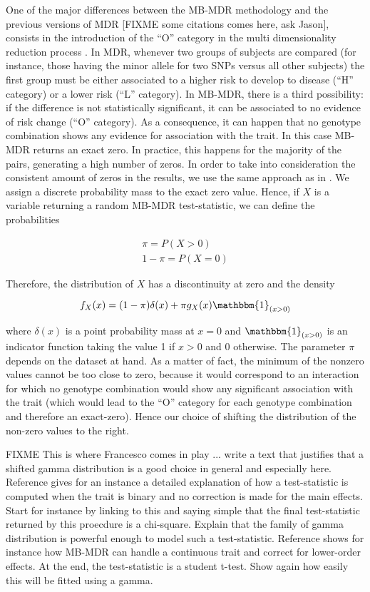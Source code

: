 \documentclass{bmcart}
\begin{document}
One of the major differences between the MB-MDR methodology and the previous versions of MDR [FIXME some citations comes here, ask Jason], consists in the introduction of the ``O'' category in the multi dimensionality reduction process \cite{Calle2008,Cattaert2011}. In MDR, whenever two groups of subjects are compared (for instance, those having the minor allele for two SNPs versus all other subjects) the first group must be either associated to a higher risk to develop to disease (``H'' category) or a lower risk (``L'' category). In MB-MDR, there is a third possibility: if the difference is not statistically significant, it can be associated to no evidence of risk change (``O'' category). As a consequence, it can happen that no genotype combination shows any evidence for association with the trait. In this case MB-MDR returns an exact zero. In practice, this happens for the majority of the pairs, generating a high number of zeros. In order to take into consideration the consistent amount of zeros in the results, we use the same approach as in \cite{Hautsch2013}. We assign a discrete probability mass to the exact zero value. Hence, if $X$ is a variable returning a random MB-MDR test-statistic, we can define the probabilities 

\begin{eqnarray*}
\pi = P(X > 0) \\
1-\pi = P(X = 0) 
\end{eqnarray*}

Therefore, the distribution of $X$ has a discontinuity at zero and the density 

\begin{equation}
f_X(x) = (1-\pi) \delta(x) + \pi g_X(x) \mathbbm{1}_{(x>0)}
\end{equation}


where $\delta(x)$ is a point probability mass at $x=0$ and $\mathbbm{1}_{(x>0)}$ is an indicator function taking the value 1 if $x>0$ and 0 otherwise. 
The parameter $\pi$ depends on the dataset at hand. As a matter of fact, the minimum of the nonzero values cannot be too close to zero, because it would correspond to an interaction for which no genotype combination would show any significant association with the trait (which would lead to the ``O'' category for each genotype combination and therefore an exact-zero). Hence our choice of shifting the distribution of the non-zero values to the right.

{\color{red} FIXME This is where Francesco comes in play ... write a text that justifies that a shifted gamma distribution is a good choice in general and especially here. Reference \cite{VanLishout2013} gives for an instance a detailed explanation of how a test-statistic is computed when the trait is binary and no correction is made for the main effects. Start for instance by linking to this and saying simple that the final test-statistic returned by this proecdure is a chi-square. Explain that the family of gamma distribution is powerful enough to model such a test-statistic. Reference \cite{Mahachie2012} shows for instance how MB-MDR can handle a continuous trait and correct for lower-order effects. At the end, the test-statistic is a student t-test. Show again how easily this will be fitted using a gamma.}
\end{document}
